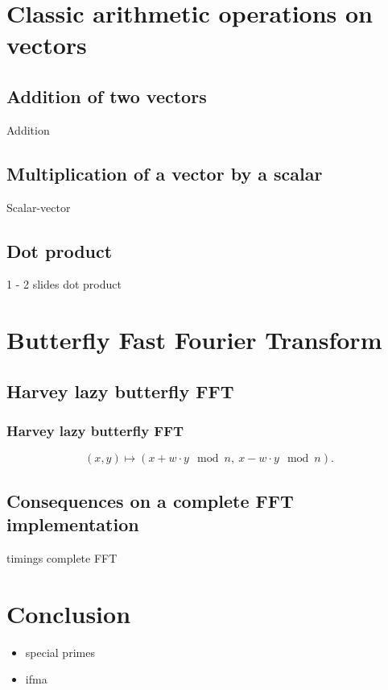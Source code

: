 \documentclass[10pt]{beamer}
\begin{document}
\section{Classic arithmetic operations on vectors}
\subsection{Addition of two vectors}
\begin{frame}
    Addition
\end{frame}

\subsection{Multiplication of a vector by a scalar}
\begin{frame}
    Scalar-vector
\end{frame}

\subsection{Dot product}
\begin{frame}
    1 - 2 slides
    dot product
\end{frame}

\section{Butterfly Fast Fourier Transform}
\subsection{Harvey lazy butterfly FFT}
\begin{frame}
    \frametitle{Harvey lazy butterfly FFT}
    \[
    (x,y) \mapsto (x + w\cdot y \mod n,\ x - w\cdot y \mod n).
    \]


\end{frame}

\subsection{Consequences on a complete FFT implementation}
\begin{frame}
    timings complete FFT
\end{frame}

\section{Conclusion}
\begin{frame}
    \begin{itemize}
        \item special primes
        \item ifma
    \end{itemize}
\end{frame}
\end{document}
